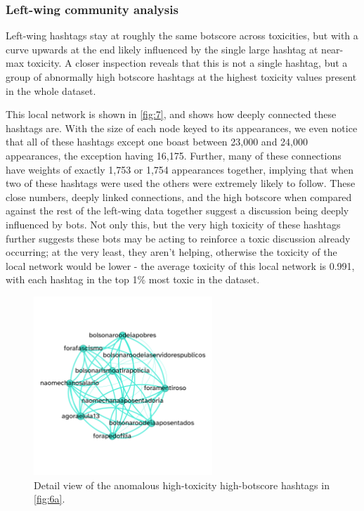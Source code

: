 \documentclass[a4paper,11pt]{article}  %
\begin{document}
	\subsubsection{Left-wing community analysis}

	Left-wing hashtags stay at roughly the same botscore across toxicities, but with a curve upwards at the end likely influenced by the single large hashtag at near-max toxicity. A closer inspection reveals that this is not a single hashtag, but a group of abnormally high botscore hashtags at the highest toxicity values present in the whole dataset. 
	
	This local network is shown in \autoref{fig:7}, and shows how deeply connected these hashtags are. With the size of each node keyed to its appearances, we even notice that all of these hashtags except one boast between 23,000 and 24,000 appearances, the exception having 16,175. Further, many of these connections have weights of exactly 1,753 or 1,754 appearances together, implying that when two of these hashtags were used the others were extremely likely to follow. These close numbers, deeply linked connections, and the high botscore when compared against the rest of the left-wing data together suggest a discussion being deeply influenced by bots. Not only this, but the very high toxicity of these hashtags further suggests these bots may be acting to reinforce a toxic discussion already occurring; at the very least, they aren't helping, otherwise the toxicity of the local network would be lower - the average toxicity of this local network is 0.991, with each hashtag in the top 1\% most toxic in the dataset.
	
	\begin{figure}[h]%
		\begin{center}
			\includegraphics[width=0.6\textwidth]{images/net_leftwing_hightox_highbot}
		\end{center}
		\caption{Detail view of the anomalous high-toxicity high-botscore hashtags in \autoref{fig:6a}.}
		\label{fig:7}
	\end{figure}
\end{document}
